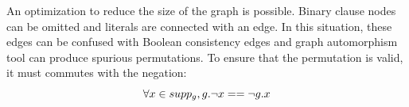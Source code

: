 %
%
%
%

An optimization to reduce the size of the graph is possible. Binary clause nodes can be omitted and literals 
are connected with an edge. In this situation, these edges can be confused with Boolean consistency edges and 
graph automorphism tool can produce spurious permutations. To ensure that the permutation is valid, 
it must commutes with the negation:
$$\forall x \in supp_g, g.\neg x == \neg g.x$$

